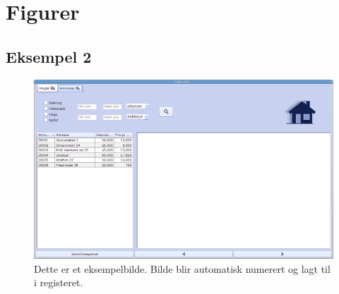 \section{Figurer}
\subsection{Eksempel 2}
\begin{figure}[ht]
 \includegraphics[width=\textwidth,height=\textheight,keepaspectratio]{./img/bruksanvisning/1.png}
 \caption{Dette er et eksempelbilde. Bilde blir automatisk numerert og lagt til i registeret.}
 \label{fig:hovedvindu}
\end{figure}


